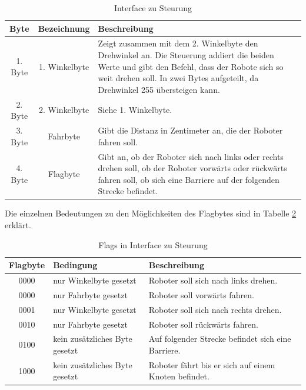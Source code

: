 \begin{table}[H]
\centering
\small
\begin{tabularx}{\textwidth}{|c|c|X|}
\hline
  \textbf{Byte} &\textbf{Bezeichnung} & \textbf{Beschreibung}\\
  \hline
      1. Byte&1. Winkelbyte &Zeigt zusammen mit dem 2. Winkelbyte den Drehwinkel an. Die Steuerung addiert die beiden Werte und gibt den Befehl, dass der Robote sich so weit drehen soll. In zwei Bytes aufgeteilt, da Drehwinkel 255 übersteigen kann.\\
  \hline
2. Byte&2. Winkelbyte&Siehe 1. Winkelbyte.\\
  \hline
  3. Byte&Fahrbyte&Gibt die Distanz in Zentimeter an, die der Roboter fahren soll.\\
  \hline
  4. Byte&Flagbyte&Gibt an, ob der Roboter sich nach links oder rechts drehen soll, ob der Roboter vorwärts oder rückwärts fahren soll, ob sich eine Barriere auf der folgenden Strecke befindet.\\
  \hline
  \end{tabularx}
\caption{Interface zu Steurung}
\label{table:interface-to-tiny}
\end{table}

Die einzelnen Bedeutungen zu den Möglichkeiten des Flagbytes sind in Tabelle \ref{table:flag-to-tiny} erklärt.

\begin{table}[H]
\centering
\small
\begin{tabularx}{\textwidth}{|c|X|X|}
\hline
  \textbf{Flagbyte} & \textbf{Bedingung} & \textbf{Beschreibung}\\
  \hline
      0000&nur Winkelbyte gesetzt&Roboter soll sich nach links drehen.\\
  \hline
        0000&nur Fahrbyte gesetzt&Roboter soll vorwärts fahren.\\
  \hline
0001&nur Winkelbyte gesetzt&Roboter soll sich nach rechts drehen.\\
  \hline

0010&nur Fahrbyte gesetzt&Roboter soll rückwärts fahren.\\
  \hline

0100&kein zusätzliches Byte gesetzt&Auf folgender Strecke befindet sich eine Barriere.\\
  \hline
1000&kein zusätzliches Byte gesetzt&Roboter fährt bis er sich auf einem Knoten befindet.\\
  \hline
  \end{tabularx}
\caption{Flags in Interface zu Steurung}
\label{table:flag-to-tiny}
\end{table}



